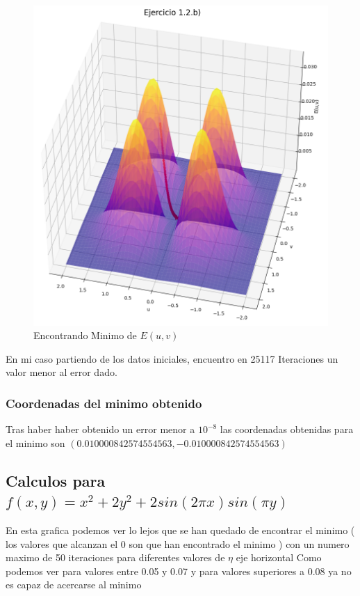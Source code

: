 {
\begin{figure}
  \centering
  \includegraphics[width=0.8\linewidth]{min2E.png}
  \caption{Encontrando Minimo de $E(u,v)$}
\end{figure}

En mi caso partiendo de los datos iniciales, encuentro en 25117 Iteraciones un valor menor al error dado.

\par
\vspace{5mm}

\subsubsection{Coordenadas del minimo obtenido}
Tras haber haber obtenido un error menor a $10^{-8}$ las coordenadas obtenidas para el minimo son
\newline $( 0.010000842574554563 ,  -0.010000842574554563 )$
\vspace{30mm}

}
\subsection{Calculos para $f(x,y) = x^2+2y^2+2sin(2 \pi x)sin(\pi y)$}

En esta grafica podemos ver lo lejos que se han quedado de encontrar
 el minimo ( los valores que alcanzan el 0 son que han encontrado el minimo ) con un numero maximo de 50 iteraciones para diferentes valores de  $\eta$ eje horizontal
 Como podemos ver para valores entre 0.05 y 0.07 y para valores superiores a 0.08 ya no es capaz de acercarse al minimo
